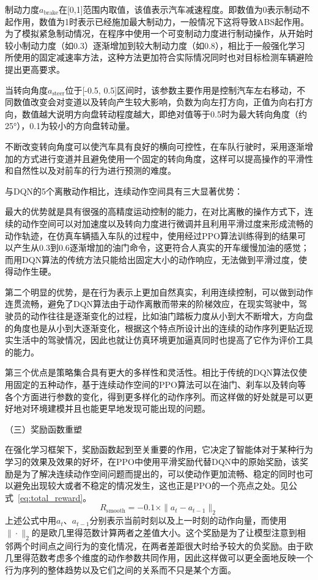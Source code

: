 制动力度$a_{\text{brake}}$在[0,1]范围内取值，该值表示汽车减速程度。即数值为0表示制动不起作用，数值为1时表示已经施加最大制动力，一般情况下这将导致ABS起作用。为了模拟紧急制动情况，在程序中使用一个可变制动力度进行制动操作，从开始时较小制动力度（如0.3）逐渐增加到较大制动力度（如0.8），相比于一般强化学习所使用的固定减速率方法，这种方法更加符合实际情况同时也对目标检测车辆避险提出更高要求。

当转向角度$a_{\text{steer}}$位于[-0.5, 0.5]区间时，该参数主要作用是控制汽车左右移动，不同数值改变会对变道以及转向产生较大影响，负数为向左打方向，正值为向右打方向，数值越大说明方向盘转动程度越大，即绝对值等于0.5时为最大转向角度（约25°），0.1为较小的方向盘转动量。

不断改变转向角度可以使汽车具有良好的横向可控性，在车队行驶时，采用逐渐增加的方式进行变道并且避免使用一个固定的转向角度，这样可以提高操作的平滑性和自然性以及对前车的行为进行预测的难度。

与DQN的5个离散动作相比，连续动作空间具有三大显著优势：

最大的优势就是具有很强的高精度运动控制的能力，在对比离散的操作方式下，连续的动作空间可以对加速度以及转向力度进行微调并且利用平滑过度来形成流畅的动作轨迹，在仿真车辆插入车队的过程中，使用经过PPO算法训练得到的结果可以产生从0.3到0.6逐渐增加的油门命令，这更符合人真实的开车缓慢加油的感觉；而用DQN算法的传统方法只能给出固定大小的动作响应，无法做到平滑过度，使得动作生硬。

第二个明显的优势，是在行为表示上更加自然真实，利用连续控制，可以做到动作连贯流畅，避免了DQN算法由于动作离散而带来的阶梯效应，在现实驾驶中，驾驶员的动作往往是逐渐变化的过程，比如油门踏板力度从小到大不断增大，方向盘的角度也是从小到大逐渐变化，根据这个特点所设计出的连续的动作序列更贴近现实生活中的驾驶情况，因此也就让仿真环境更加逼真同时也提高了它作为评价工具的能力。

第三个优点是策略集合具有更大的多样性和灵活性。相比于传统的DQN算法仅使用固定的五种动作，基于连续动作空间的PPO算法可以在油门、刹车以及转向等各个方面进行参数的变化，得到更多样化的动作序列。而这样做的好处就是可以更好地对环境建模并且也能更早地发现可能出现的问题。

（三）奖励函数重塑

在强化学习框架下，奖励函数起到至关重要的作用，它决定了智能体对于某种行为学习的效果及效果的好坏，在PPO中使用平滑奖励代替DQN中的原始奖励，该奖励是为了解决连续动作空间问题而提出的，可以使动作更加流畅、稳定的同时也可以避免出现较大或者不稳定的情况发生，这也正是PPO的一个亮点之处。见公式~\ref{eq:total_reward}。
\begin{equation}
R_{\text{smooth}} = -0.1 \times \| a_t - a_{t-1} \|_2
\label{eq:smooth_reward}
\end{equation}
上述公式中用$a_t$、$a_{t-1}$分别表示当前时刻以及上一时刻的动作向量，而使用$\|\cdot\|_2$的是欧几里得范数计算两者之差值大小。这个奖励是为了让模型注意到相邻两个时间点之间行为的变化情况，在两者差距很大时给予较大的负奖励。由于欧几里得范数考虑多个维度的动作参数共同作用，因此这样做可以更全面地反映一个行为序列的整体趋势以及它们之间的关系而不只是某个方面。

